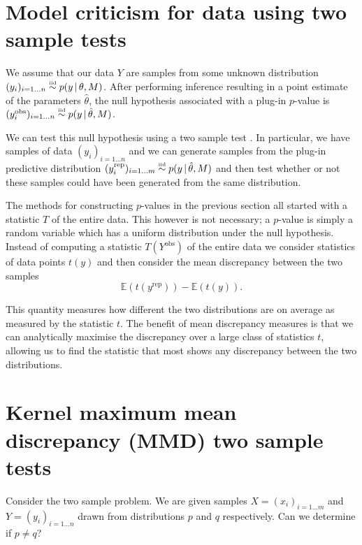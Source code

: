 \section{Model criticism for \iid data using two sample tests}
\label{sec:model-crit-two-sample}

We assume that our data $Y$ are \iid samples from some unknown distribution ${(y_i)_{i=1\ldots n} \overset{\mbox{\tiny iid}}{\sim} p(y\,|\, \theta, M)}$.
After performing inference resulting in a point estimate of the parameters $\hat\theta$, the null hypothesis associated with a plug-in $p$-value is ${(y^\textrm{obs}_i)_{i=1\ldots n} \overset{\mbox{\tiny iid}}{\sim} p(y \,|\, \hat\theta, M)}$.

We can test this null hypothesis using a two sample test \citep[e.g.][]{Friedman1979-ur, Bickel1969-ao, Hotelling1951-jd}.
In particular, we have samples of data $(y_i)_{i=1\ldots n}$ and we can generate samples from the plug-in predictive distribution ${(y_i^\textrm{rep})_{i=1\ldots m} \overset{\mbox{\tiny iid}}{\sim} p(y \,|\, \hat\theta, M)}$ and then test whether or not these samples could have been generated from the same distribution.

The methods for constructing $p$-values in the previous section all started with a statistic $T$ of the entire data.
This however is not necessary; a $p$-value is simply a random variable which has a uniform distribution under the null hypothesis.
Instead of computing a statistic $T(Y^\textrm{obs})$ of the entire data we consider statistics of data points $t(y)$ and then consider the mean discrepancy between the two samples
\begin{equation}
\mathbb{E}(t(y^\textrm{rep})) - \mathbb{E}(t(y)).
\end{equation}

This quantity measures how different the two distributions are on average as measured by the statistic $t$.
The benefit of mean discrepancy measures is that we can analytically maximise the discrepancy over a large class of statistics $t$, allowing us to find the statistic that most shows any discrepancy between the two distributions.

\section{Kernel maximum mean discrepancy (MMD) two sample tests}

Consider the two sample problem. We are given samples ${X = (x_i)_{i=1\ldots m}}$ and ${Y = (y_i)_{i=1\ldots n}}$ drawn \iid from distributions $p$ and $q$ respectively.
Can we determine if $p \neq q$?

